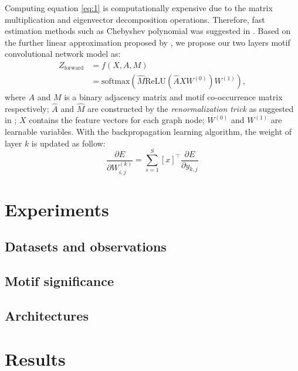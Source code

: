 \documentclass{article}
\theoremstyle{definition}
\begin{document}
Computing equation \ref{eq:1} is computationally expensive
due to the matrix multiplication and eigenvector decomposition operations.
Therefore, fast estimation methods such as Chebyshev polynomial was suggested
in \cite{hammond2011wavelets}. Based on the further linear approximation
proposed by \citeauthor{gcn}, we propose our two layers motif convolutional network
model as:
\begin{equation} \label{eq:2}
    \begin{aligned}
    Z_{\mbox{forward}} &= f(X,A,M) \\
    &= \mbox{softmax}(\hat{M} \mbox{ReLU}(\hat{A}XW^{(0)})W^{(1)}),
    \end{aligned}
\end{equation}
where $A$ and $M$ is a binary adjacency matrix and motif co-occurrence
matrix respectively; $\hat{A}$ and $\hat{M}$ are constructed by the
\emph{renormalization trick} as suggested in \cite{gcn}; $X$ contains
the feature vectors for each graph node; $W^{(0)}$ and $W^{(1)}$ are
learnable variables. With the backpropagation learning algorithm, the
weight of layer $k$ is updated as follow: 
\begin{equation}
\label{eq:3}
\frac{\partial E}{\partial W^{(k)}_{i,j}} = \sum^S_{s=1} [x]^\top \frac{\partial E}{\partial y_{k,j}}
\end{equation}

\section{Experiments}



\subsection{Datasets and observations}

\subsection{Motif significance}

\subsection{Architectures}

\section{Results}
\end{document}
